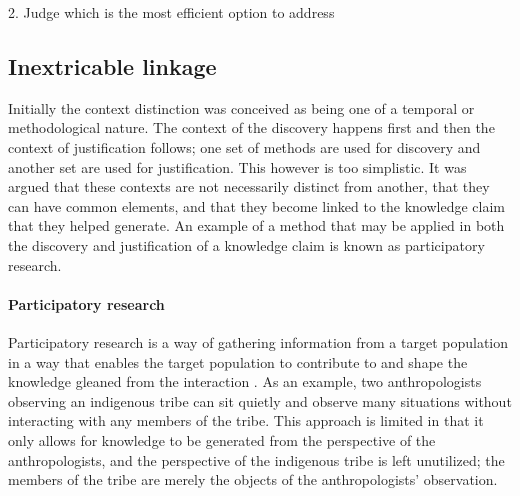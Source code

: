 \documentclass[a4paper]{article}
\begin{document}
2. Judge which is the most efficient option to address



\subsection{Inextricable linkage}


Initially the context distinction was conceived as being one of a temporal or
methodological nature. The context of the discovery happens first and then the
context of justification follows; one set of methods are used for discovery
and another set are used for justification. This however is too simplistic.
It was argued that these contexts are not necessarily distinct from another,
that they can have common elements, and that they become linked to the
knowledge claim that they helped generate. An example of a method that may be
applied in both the discovery and justification of a knowledge claim is known
as participatory research.

\paragraph{Participatory research}
\label{part}

Participatory research is a way of gathering information from a target
population in a way that enables the target population to contribute to and
shape the knowledge gleaned from the interaction
\cite{bergold2012participatory}. As an example, two anthropologists observing
an indigenous tribe can sit quietly and observe many situations without
interacting with any members of the tribe. This approach is limited in that it
only allows for knowledge to be generated from the perspective of the
anthropologists, and the perspective of the indigenous tribe is left
unutilized; the members of the tribe are merely the objects of the
anthropologists' observation.
\end{document}
